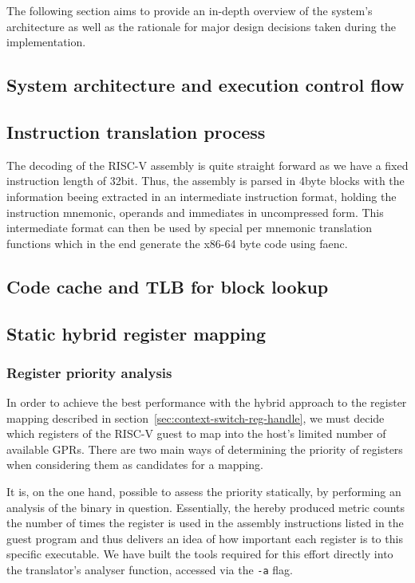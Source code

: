 The following section aims to provide an in-depth overview of the system's architecture as well as the rationale for major design decisions taken during the implementation.

\subsection{System architecture and execution control flow}

\subsection{Instruction translation process}
The decoding of the RISC-V assembly is quite straight forward as we have a fixed instruction length of 32bit.
Thus, the assembly is parsed in 4byte blocks with the information beeing extracted in an intermediate instruction format, holding the instruction mnemonic, operands and immediates in uncompressed form.
This intermediate format can then be used by special per mnemonic translation functions which in the end generate the x86-64 byte code using faenc.

\subsection{Code cache and TLB for block lookup}

\subsection{Static hybrid register mapping}
\subsubsection{Register priority analysis}
In order to achieve the best performance with the hybrid approach to the register mapping described in section~\vref{sec:context-switch-reg-handle}, we must decide which registers of the RISC-V guest to map into the host's limited number of available GPRs.
There are two main ways of determining the priority of registers when considering them as candidates for a mapping.

It is, on the one hand, possible to assess the priority statically, by performing an analysis of the binary in question.
Essentially, the hereby produced metric counts the number of times the register is used in the assembly instructions listed in the guest program and thus delivers an idea of how important each register is to this specific executable.
We have built the tools required for this effort directly into the translator's analyser function, accessed via the \texttt{-a} flag.

